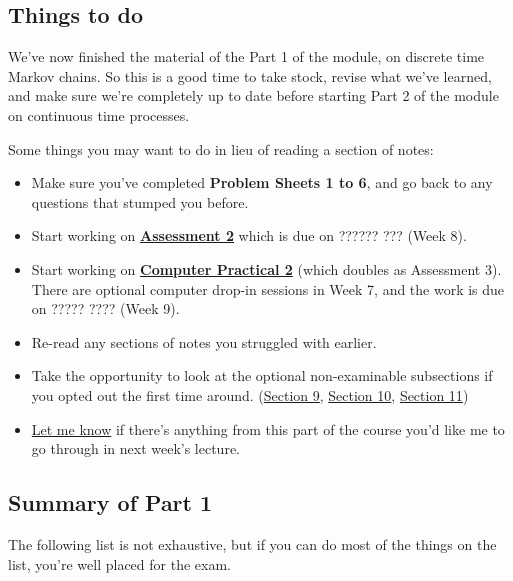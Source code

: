 \documentclass[
  a4paper,
]{article}
\providecommand{\tightlist}{%
  \setlength{\itemsep}{0pt}\setlength{\parskip}{0pt}}
\theoremstyle{definition}
\theoremstyle{definition}
\theoremstyle{definition}
\theoremstyle{remark}
\begin{document}
\hypertarget{S12-revision}{%
\subsection{Things to do}\label{S12-revision}}

We've now finished the material of the Part 1 of the module, on discrete time Markov chains. So this is a good time to take stock, revise what we've learned, and make sure we're completely up to date before starting Part 2 of the module on continuous time processes.

Some things you may want to do in lieu of reading a section of notes:

\begin{itemize}
\tightlist
\item
  Make sure you've completed \textbf{Problem Sheets 1 to 6}, and go back to any questions that stumped you before.
\item
  Start working on \textbf{\protect\hyperlink{A2}{Assessment 2}} which is due on ?????? ??? (Week 8).
\item
  Start working on \textbf{\protect\hyperlink{computer}{Computer Practical 2}} (which doubles as Assessment 3). There are optional computer drop-in sessions in Week 7, and the work is due on ????? ???? (Week 9).
\item
  Re-read any sections of notes you struggled with earlier.
\item
  Take the opportunity to look at the optional non-examinable subsections if you opted out the first time around. (\protect\hyperlink{S09-strong-markov}{Section 9}, \protect\hyperlink{S10-proof}{Section 10}, \protect\hyperlink{S11-proofs}{Section 11})
\item
  \href{mailto:m.aldridge@leeds.ac.uk}{Let me know} if there's anything from this part of the course you'd like me to go through in next week's lecture.
\end{itemize}

\hypertarget{S12-summary-i}{%
\subsection{Summary of Part 1}\label{S12-summary-i}}

The following list is not exhaustive, but if you can do most of the things on the list, you're well placed for the exam.
\end{document}

